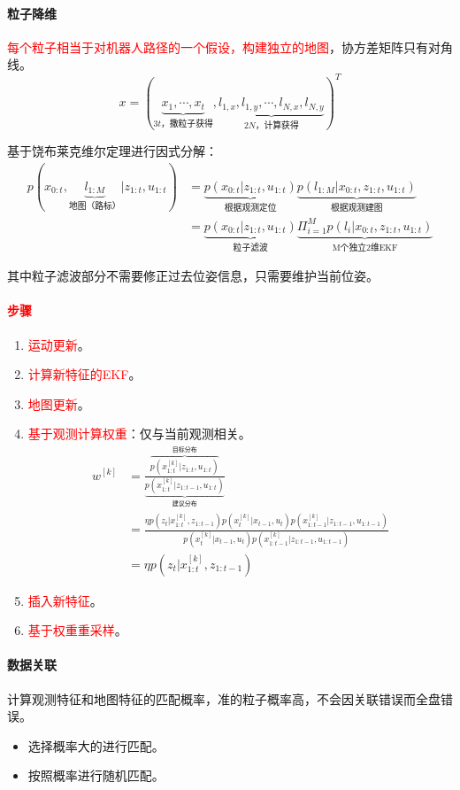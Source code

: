 \documentclass[
12pt, %
a4paper, 
oneside, %
]{scrartcl}
\begin{document}
\paragraph{粒子降维}
\textcolor{red}{每个粒子相当于对机器人路径的一个假设，构建独立的地图}，协方差矩阵只有对角线。
$$ x = (\underbrace{x_1, \cdots, x_t}_{3t\text{，撒粒子获得}}, \underbrace{l_{1, x}, l_{1, y}, \cdots, l_{N, x}, l_{N, y}}_{2N\text{，计算获得}})^T $$

基于饶布莱克维尔定理进行因式分解：
\begin{align*}
p(x_{0:t}, \underbrace{l_{1:M}}_{\text{地图（路标）}}|z_{1:t}, u_{1:t}) 
&= \underbrace{p(x_{0:t}|z_{1:t}, u_{1:t})}_{\text{根据观测定位}} \underbrace{p(l_{1:M}|x_{0:t}, z_{1:t}, u_{1:t})}_{\text{根据观测建图}} \\
&= \underbrace{p(x_{0:t}|z_{1:t}, u_{1:t})}_{\text{粒子滤波}} \underbrace{\Pi_{i = 1}^M p(l_i|x_{0:t}, z_{1:t}, u_{1:t})}_{\text{M个独立2维EKF}}
\end{align*}

其中粒子滤波部分不需要修正过去位姿信息，只需要维护当前位姿。
\paragraph{\textcolor{red}{步骤}}
\begin{enumerate}
\item \textcolor{red}{运动更新}。
\item \textcolor{red}{计算新特征的EKF}。
\item \textcolor{red}{地图更新}。
\item \textcolor{red}{基于观测计算权重}：仅与当前观测相关。
\begin{align*}
w^{[k]} &= \frac{\overbrace{p(x_{1:t}^{[k]}|z_{1:t}, u_{1:t})}^{\text{目标分布}}}{\underbrace{p(x_{1:t}^{[k]}|z_{1:t - 1}, u_{1:t})}_{\text{建议分布}}} \\
&= \frac{\eta p(z_t | x_{1:t}^{[k]}, z_{1:t - 1})p(x_t^{[k]}|x_{t - 1}, u_t)p(x_{1:t - 1}^{[k]}|z_{1:t - 1}, u_{1:t - 1})}{p(x_t^{[k]}|x_{t - 1}, u_t)p(x_{1:t - 1}^{[k]}|z_{1:t - 1}, u_{1:t - 1})} \\
&= \eta p(z_t|x_{1:t}^{[k]}, z_{1:t - 1})
\end{align*}
\item \textcolor{red}{插入新特征}。
\item \textcolor{red}{基于权重重采样}。
\end{enumerate}
\paragraph{数据关联}
计算观测特征和地图特征的匹配概率，准的粒子概率高，不会因关联错误而全盘错误。
\begin{itemize}
\item 选择概率大的进行匹配。
\item 按照概率进行随机匹配。
\end{itemize}
\end{document}
